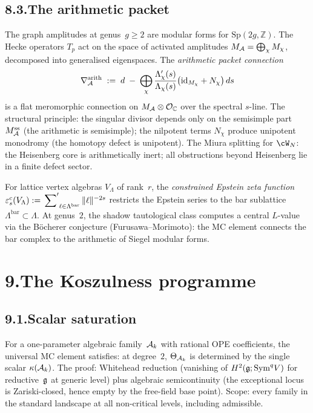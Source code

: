 \subsection*{8.3.\enspace The arithmetic packet}

The graph amplitudes at genus~$g\ge 2$ are modular forms for
$\mathrm{Sp}(2g,\mathbb Z)$. The Hecke operators $T_p$ act
on the space of activated amplitudes
$M_{\mathcal{A}}=\bigoplus_\chi M_\chi$, decomposed into generalised
eigenspaces. The \emph{arithmetic packet connection}
\[
\nabla^{\mathrm{arith}}_{\mathcal{A}}
\;:=\;
d \;-\; \bigoplus_\chi
\frac{\Lambda'_\chi(s)}{\Lambda_\chi(s)}
\bigl(\mathrm{id}_{M_\chi}+N_\chi\bigr)\,ds
\]
is a flat meromorphic connection on $M_{\mathcal{A}}\otimes\mathcal{O}_{\mathbb C}$
over the spectral $s$-line. The structural principle: the
singular divisor depends only on the semisimple part
$M^{\mathrm{ss}}_{\mathcal{A}}$ (the arithmetic is semisimple); the
nilpotent terms $N_\chi$ produce unipotent monodromy (the
homotopy defect is unipotent). The Miura splitting for
$\cW_N$: the Heisenberg core is arithmetically inert; all
obstructions beyond Heisenberg lie in a finite defect sector.

For lattice vertex algebras $V_\Lambda$ of rank~$r$, the
\emph{constrained Epstein zeta function}
$\varepsilon^c_s(V_\Lambda)
:=\sideset{}{'}\sum_{\ell\in\Lambda^{\mathrm{bar}}}
\|\ell\|^{-2s}$
restricts the Epstein series to the bar sublattice
$\Lambda^{\mathrm{bar}}\subset\Lambda$. At genus~$2$, the
shadow tautological class computes a central $L$-value via the
B\"ocherer conjecture (Furusawa--Morimoto): the MC element
connects the bar complex to the arithmetic of Siegel modular
forms.


\section*{9.\quad The Koszulness programme}

\subsection*{9.1.\enspace Scalar saturation}

For a one-parameter algebraic family~$\mathcal{A}_k$ with rational OPE
coefficients, the universal MC element satisfies: at degree~$2$,
$\Theta_{\mathcal{A}_k}$ is determined by the single scalar
$\kappa(\mathcal{A}_k)$. The proof: Whitehead reduction
(vanishing of $H^2(\mathfrak{g};\mathrm{Sym}^q V)$ for reductive~$\mathfrak{g}$
at generic level) plus algebraic semicontinuity (the exceptional
locus is Zariski-closed, hence empty by the free-field base
point). Scope: every family in the standard landscape at all
non-critical levels, including admissible.

